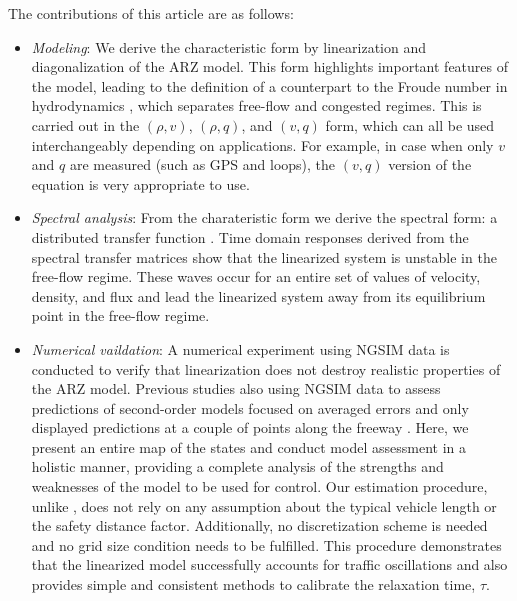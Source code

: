\documentclass[preprint]{elsarticle}
\begin{document}
The contributions of this article are as follows:

\begin{itemize}
\item \textit{Modeling}: We derive the characteristic form by linearization and diagonalization of the ARZ model. This form highlights important features of the model, leading to the definition of a counterpart to the Froude number in hydrodynamics \cite{litrico2009modeling}, which separates free-flow and congested regimes. This is carried out in the $\left(\rho, v \right)$, $\left(\rho, q\right)$, and $\left(v, q\right)$ form, which can all be used interchangeably depending on applications. For example, in case when only $v$ and $q$ are measured (such as GPS and loops), the $\left(v, q\right)$ version of the equation is very appropriate to use.

\item \textit{Spectral analysis}: From the charateristic form we derive the spectral form: a distributed transfer function \cite{litrico2009modeling}. Time domain responses derived from the spectral transfer matrices show that the linearized system is unstable in the free-flow regime. These waves occur for an entire set of values of velocity, density, and flux and lead the linearized system away from its equilibrium point in the free-flow regime. 

\item \textit{Numerical vaildation}: A numerical experiment using NGSIM data is conducted to verify that linearization does not destroy realistic properties of the ARZ model. Previous studies also using NGSIM data to assess predictions of second-order models focused on averaged errors and only displayed predictions at a couple of points along the freeway \cite{GodunovARZ,Fan}. Here, we present an entire map of the states and conduct model assessment in a holistic manner, providing a complete analysis of the strengths and weaknesses of the model to be used for control. Our estimation procedure, unlike \cite{Fan}, does not rely on any assumption about the typical vehicle length or the safety distance factor. Additionally, no discretization scheme is needed and no grid size condition needs to be fulfilled. This procedure demonstrates that the linearized model successfully accounts for traffic oscillations and also provides simple and consistent methods to calibrate the relaxation time, $\tau$.
\end{itemize}
\end{document}

